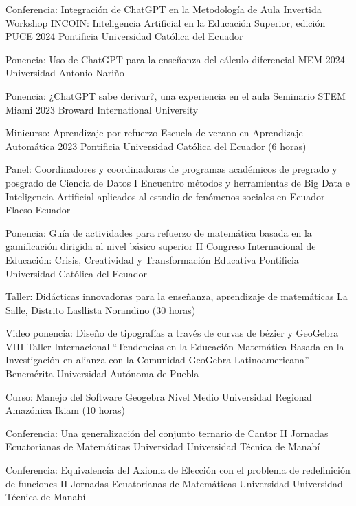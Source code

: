 \documentclass[
	a4paper,
	maincolor=cvblue!70!blue,
	sidecolor=gray!30,
	sectioncolor=cvblue!70!blue,
    sidebarwidth=7.5cm,
	topbottommargin=20pt,
	leftrightmargin=20pt,
]{fortysecondscv}
\begin{document}
    {Conferencia: Integración de ChatGPT en la Metodología de Aula Invertida}
    {Workshop INCOIN: Inteligencia Artificial en la Educación Superior, edición PUCE 2024}
    {Pontificia Universidad Católica del Ecuador}
    
    {Ponencia: Uso de ChatGPT para la enseñanza del cálculo diferencial}
    {MEM 2024}
    {Universidad Antonio Nariño}
    
    {Ponencia: ¿ChatGPT sabe derivar?, una experiencia en el aula}
    {Seminario STEM Miami 2023}
    {Broward International University}
    
    
    {Minicurso: Aprendizaje por refuerzo}
    {Escuela de verano en Aprendizaje Automática 2023}
    {Pontificia Universidad Católica del Ecuador (6 horas)}
    
    
    {Panel: Coordinadores y coordinadoras de  programas académicos de pregrado y posgrado de Ciencia de Datos}
    {I Encuentro métodos y herramientas de Big Data e Inteligencia Artificial aplicados al estudio de fenómenos sociales en Ecuador}
    {Flacso Ecuador}
    
    {Ponencia: Guía de actividades para refuerzo de matemática basada en la gamificación dirigida al nivel básico superior}
    {II Congreso Internacional de Educación: Crisis, Creatividad y Transformación Educativa}
    {Pontificia Universidad Católica del Ecuador}
    
    {Taller: Didácticas innovadoras para la enseñanza, aprendizaje de matemáticas}
    {}
    {La Salle, Distrito Lasllista Norandino (30 horas)}
    
    {Video ponencia: Diseño de tipografías a través de curvas de bézier y GeoGebra}
    {VIII Taller Internacional “Tendencias en la Educación Matemática Basada en la Investigación en alianza con la Comunidad GeoGebra Latinoamericana”}
    {Benemérita Universidad Autónoma de Puebla}
    

    {Curso: Manejo del Software Geogebra Nivel Medio}
    {}
    {Universidad Regional Amazónica Ikiam (10 horas)}
    
    {Conferencia: Una generalización del conjunto ternario de Cantor}
    {II Jornadas Ecuatorianas de Matemáticas}
    {Universidad Universidad Técnica de Manabí}
    

    {Conferencia: Equivalencia del Axioma de Elección con el problema de redefinición de funciones}
    {II Jornadas Ecuatorianas de Matemáticas}
    {Universidad Universidad Técnica de Manabí}
    
\end{document}
